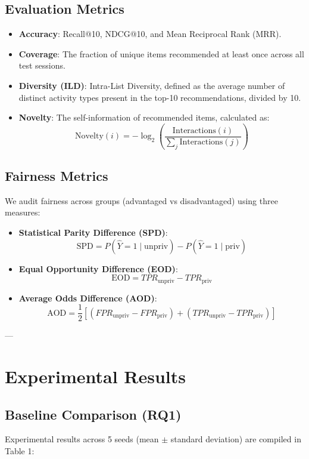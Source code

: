 \documentclass[10pt,journal,compsoc]{IEEEtran}
\begin{document}
\subsection{Evaluation Metrics}
\begin{itemize}
    \item \textbf{Accuracy}: Recall@10, NDCG@10, and Mean Reciprocal Rank (MRR).
    \item \textbf{Coverage}: The fraction of unique items recommended at least once across all test sessions.
    \item \textbf{Diversity (ILD)}: Intra-List Diversity, defined as the average number of distinct activity types present in the top-10 recommendations, divided by 10.
    \item \textbf{Novelty}: The self-information of recommended items, calculated as:
      $$\text{Novelty}(i) = -\log_2 \left( \frac{\text{Interactions}(i)}{\sum_j \text{Interactions}(j)} \right)$$
\end{itemize}

\subsection{Fairness Metrics}
We audit fairness across groups (advantaged vs disadvantaged) using three measures:
\begin{itemize}
    \item \textbf{Statistical Parity Difference (SPD)}:
      $$\text{SPD} = P(\hat{Y}=1 \mid \text{unpriv}) - P(\hat{Y}=1 \mid \text{priv})$$
    \item \textbf{Equal Opportunity Difference (EOD)}:
      $$\text{EOD} = TPR_{\text{unpriv}} - TPR_{\text{priv}}$$
    \item \textbf{Average Odds Difference (AOD)}:
      $$\text{AOD} = \frac{1}{2} \left[ (FPR_{\text{unpriv}} - FPR_{\text{priv}}) + (TPR_{\text{unpriv}} - TPR_{\text{priv}}) \right]$$
\end{itemize}

---

\section{Experimental Results}

\subsection{Baseline Comparison (RQ1)}
Experimental results across 5 seeds (mean $\pm$ standard deviation) are compiled in Table 1:
\end{document}
